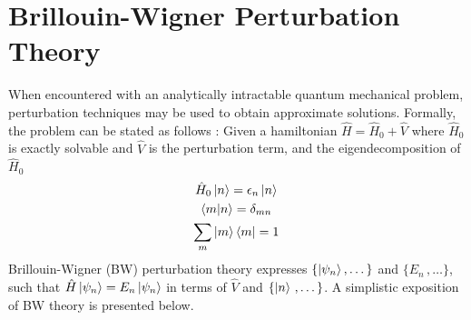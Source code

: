 \chapter{Brillouin-Wigner Perturbation Theory}
When encountered with an analytically intractable quantum mechanical problem, perturbation techniques 
may be used to obtain approximate solutions. Formally, the problem can be stated as follows : 
Given a hamiltonian $\hat{H} = \hat{H}_{0} + \hat{V}$ where $\hat{H}_{0}$ is exactly solvable and 
$\hat{V}$ is the perturbation term, and the eigendecomposition of $\hat{H}_{0}\quad$ \textemdash 
\begin{gather*}
  \hat{H}_{0}\ket{n} = \epsilon_{n}\ket{n} \\
  \braket{m|n} = \delta_{mn} \\
  \sum_{m} {\ket{m} \bra{m}} = \mathrm{1}
\end{gather*}
Brillouin-Wigner (BW) perturbation theory expresses $\{\ket{\psi_n},\dots\}$ and $\{E_n\,,\dots\}$, such that
$\hat{H}\ket{\psi_n} = E_n\ket{\psi_n}$ in terms of $\hat{V}$ and $\{\ket{n}\,,\dots\}$.
A simplistic exposition of BW theory is presented below.

